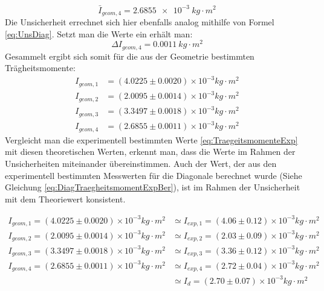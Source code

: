 \documentclass{report}
\begin{document}
\begin{equation}
    \bar{I}_{geom, 4} = \qty{2.6855e-3}{kg \cdot m^2}
\end{equation}
Die Unsicherheit errechnet sich hier ebenfalls analog mithilfe von Formel \ref{eq:UnsDiag}. Setzt man die Werte ein erhält man:
\begin{equation}
    \Delta I_{geom, 4} = \qty{0.0011}{kg \cdot m^2}
\end{equation}
Gesammelt ergibt sich somit für die aus der Geometrie bestimmten Trägheitsmomente:
\begin{equation}
    \boxed{
        \begin{aligned}
            I_{geom, 1} &= (4.0225 \pm 0.0020) \times 10^{-3} \si{kg \cdot m^2} \\
            I_{geom, 2} &= (2.0095 \pm 0.0014) \times 10^{-3} \si{kg \cdot m^2} \\
            I_{geom, 3} &= (3.3497 \pm 0.0018) \times 10^{-3} \si{kg \cdot m^2} \\
            I_{geom, 4} &= (2.6855 \pm 0.0011) \times 10^{-3} \si{kg \cdot m^2}
        \end{aligned}
    }
\end{equation}
Vergleicht man die experimentell bestimmten Werte \ref{eq:TraegeitsmomenteExp} mit diesen theoretischen Werten, erkennt man, dass die Werte im Rahmen der Unsicherheiten 
miteinander übereinstimmen. Auch der Wert, der aus den experimentell bestimmten Messwerten für die Diagonale berechnet wurde (Siehe Gleichung \ref{eq:DiagTraegheitsmomentExpBer}), 
ist im Rahmen der Unsicherheit mit dem Theoriewert konsistent.

\begin{equation}
    \boxed{
        \begin{aligned}
            I_{geom, 1} = (4.0225 \pm 0.0020) \times 10^{-3} \si{kg \cdot m^2} &\simeq I_{exp,1} = (4.06 \pm 0.12) \times 10^{-3} \si{kg \cdot m^2}\\[10pt]
            I_{geom, 2} = (2.0095 \pm 0.0014) \times 10^{-3} \si{kg \cdot m^2} &\simeq I_{exp,2} = (2.03 \pm 0.09) \times 10^{-3} \si{kg \cdot m^2}\\[10pt]
            I_{geom, 3} = (3.3497 \pm 0.0018) \times 10^{-3} \si{kg \cdot m^2} &\simeq I_{exp,3} = (3.36 \pm 0.12) \times 10^{-3} \si{kg \cdot m^2}\\[10pt]
            I_{geom, 4} = (2.6855 \pm 0.0011) \times 10^{-3} \si{kg \cdot m^2} &\simeq I_{exp,4} = (2.72 \pm 0.04) \times 10^{-3} \si{kg \cdot m^2}\\
                                                                               &\simeq I_d = (2.70 \pm 0.07) \times 10^{-3} \si{kg \cdot m^2}
        \end{aligned}
    }
\end{equation}
\end{document}
